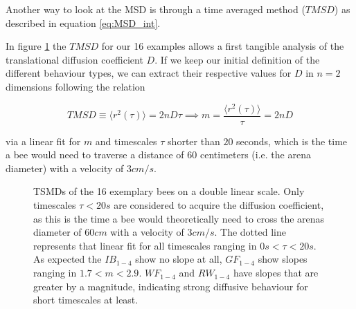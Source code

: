 Another way to look at the MSD is through a time averaged method ($TMSD$) as described in equation \ref{eq:MSD_int}.

In figure \ref{fig:MSD_lin_fit} the $TMSD$ for our 16 examples allows a first tangible analysis of the translational diffusion coefficient $D$. If we keep our initial definition of the different behaviour types, we can extract their respective values for $D$ in $n=2$ dimensions following the relation 

\begin{equation}
    \label{eq:Diff_Relation}
    TMSD \equiv \langle r^{2}(\tau) \rangle = 2nD\tau \implies m=\frac{\langle r^{2}(\tau) \rangle}{\tau}=2nD
\end{equation}

via a linear fit for $m$ and timescales $\tau$ shorter than $20$ seconds, which is the time a bee would need to traverse a distance of $60$ centimeters (i.e. the arena diameter) with a velocity of $3cm/s$. \cite{nouvian2019}

\begin{figure}%
    \centering
    \caption{TSMDs of the 16 exemplary bees on a double linear scale. Only timescales $\tau < 20s$ are considered to acquire the diffusion coefficient, as this is the time a bee would theoretically need to cross the arenas diameter of $60cm$ with a velocity of $3cm/s$. The dotted line represents that linear fit for all timescales ranging in $0s<\tau<20s$. As expected the $IB_{1-4}$ show no slope at all, $GF_{1-4}$ show slopes ranging in $1.7 < m < 2.9$. $WF_{1-4}$ and $RW_{1-4}$ have slopes that are greater by a magnitude, indicating strong diffusive behaviour for short timescales at least.}
    \label{fig:MSD_lin_fit}
\end{figure}

